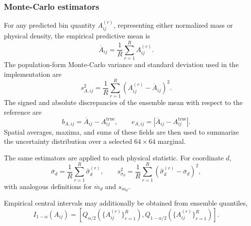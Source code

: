 \subsubsection{Monte-Carlo estimators}
\label{subsubsec:uq_mc_estimators}

For any predicted bin quantity \(A_{ij}^{(r)}\), representing either normalized mass or physical density, the empirical predictive mean is
\begin{equation}
\overline{A}_{ij}
=
\frac{1}{R}
\sum_{r=1}^{R}
A_{ij}^{(r)}.
\label{eq:uq_predictive_mean}
\end{equation}
The population-form Monte-Carlo variance and standard deviation used in the implementation are
\begin{equation}
s_{A,ij}^{2}
=
\frac{1}{R}
\sum_{r=1}^{R}
\left(
A_{ij}^{(r)}
-
\overline{A}_{ij}
\right)^{2}.
\label{eq:uq_predictive_variance}
\end{equation}
The signed and absolute discrepancies of the ensemble mean with respect to the reference are
\begin{equation}
b_{A,ij}
=
\overline{A}_{ij}
-
A_{ij}^{\mathrm{true}},
\qquad
e_{A,ij}
=
\left|
\overline{A}_{ij}
-
A_{ij}^{\mathrm{true}}
\right|.
\label{eq:uq_ensemble_discrepancy}
\end{equation}
Spatial averages, maxima, and sums of these fields are then used to summarize the uncertainty distribution over a selected \(64\times64\) marginal.

The same estimators are applied to each physical statistic. For coordinate \(d\),
\begin{equation}
\overline{\sigma}_{d}
=
\frac{1}{R}
\sum_{r=1}^{R}
\widehat{\sigma}_{d}^{(r)},
\qquad
s_{\sigma_d}^{2}
=
\frac{1}{R}
\sum_{r=1}^{R}
\left(
\widehat{\sigma}_{d}^{(r)}
-
\overline{\sigma}_{d}
\right)^{2},
\label{eq:uq_sigma_estimators}
\end{equation}
with analogous definitions for \(\overline{m}_{d}\) and \(s_{m_d}\).

Empirical central intervals may additionally be obtained from ensemble quantiles,
\begin{equation}
I_{1-\alpha}(A_{ij})
=
\left[
Q_{\alpha/2}
\left(
\{A_{ij}^{(r)}\}_{r=1}^{R}
\right),
Q_{1-\alpha/2}
\left(
\{A_{ij}^{(r)}\}_{r=1}^{R}
\right)
\right].
\label{eq:uq_empirical_interval}
\end{equation}

